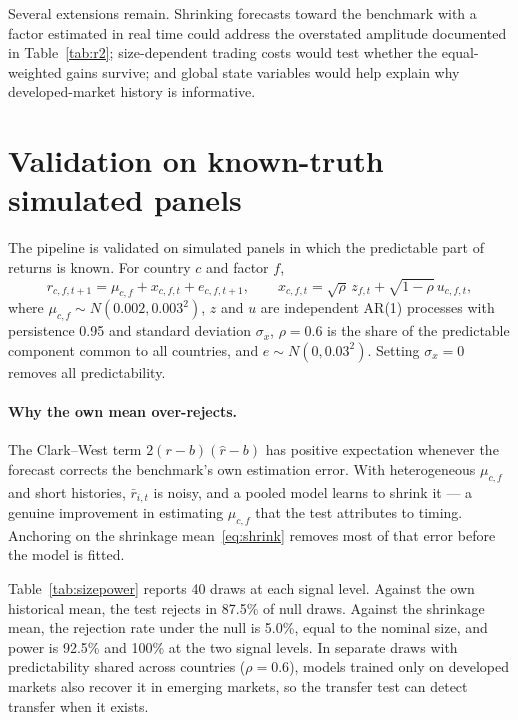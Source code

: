 \documentclass[11pt]{article}
\begin{document}
Several extensions remain. Shrinking forecasts toward the benchmark with a factor estimated in real time could address the overstated amplitude documented in Table~\ref{tab:r2}; size-dependent trading costs would test whether the equal-weighted gains survive; and global state variables would help explain why developed-market history is informative.

\clearpage


\clearpage
\appendix
\section{Validation on known-truth simulated panels}
\label{app:validation}

The pipeline is validated on simulated panels in which the predictable part of returns is known. For country $c$ and factor $f$,
\begin{equation}
r_{c,f,t+1} = \mu_{c,f} + x_{c,f,t} + e_{c,f,t+1}, \qquad
x_{c,f,t} = \sqrt{\rho}\, z_{f,t} + \sqrt{1-\rho}\, u_{c,f,t},
\label{eq:dgp}
\end{equation}
where $\mu_{c,f} \sim N(0.002, 0.003^2)$, $z$ and $u$ are independent AR(1) processes with persistence 0.95 and standard deviation $\sigma_x$, $\rho = 0.6$ is the share of the predictable component common to all countries, and $e \sim N(0, 0.03^2)$. Setting $\sigma_x = 0$ removes all predictability.

\paragraph{Why the own mean over-rejects.} The Clark--West term $2(r-b)(\hat r - b)$ has positive expectation whenever the forecast corrects the benchmark's own estimation error. With heterogeneous $\mu_{c,f}$ and short histories, $\bar r_{i,t}$ is noisy, and a pooled model learns to shrink it --- a genuine improvement in estimating $\mu_{c,f}$ that the test attributes to timing. Anchoring on the shrinkage mean~\eqref{eq:shrink} removes most of that error before the model is fitted.



Table~\ref{tab:sizepower} reports 40 draws at each signal level. Against the own historical mean, the test rejects in 87.5\% of null draws. Against the shrinkage mean, the rejection rate under the null is 5.0\%, equal to the nominal size, and power is 92.5\% and 100\% at the two signal levels. In separate draws with predictability shared across countries ($\rho = 0.6$), models trained only on developed markets also recover it in emerging markets, so the transfer test can detect transfer when it exists.
\end{document}
